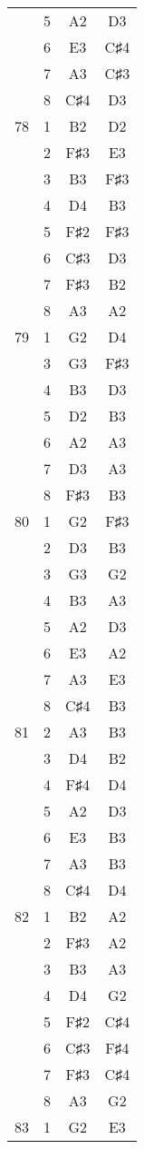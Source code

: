 \documentclass{article}
\begin{document}
\begin{longtable}{|c|c|c|c|}
  & 5 & A2 & D3 \\ 
  & 6 & E3 & C♯4 \\ 
  & 7 & A3 & C♯3 \\ 
  & 8 & C♯4 & D3 \\ 
\hline
78 & 1 & B2 & D2 \\ 
  & 2 & F♯3 & E3 \\ 
  & 3 & B3 & F♯3 \\ 
  & 4 & D4 & B3 \\ 
  & 5 & F♯2 & F♯3 \\ 
  & 6 & C♯3 & D3 \\ 
  & 7 & F♯3 & B2 \\ 
  & 8 & A3 & A2 \\ 
\hline
79 & 1 & G2 & D4 \\ 
  & 3 & G3 & F♯3 \\ 
  & 4 & B3 & D3 \\ 
  & 5 & D2 & B3 \\ 
  & 6 & A2 & A3 \\ 
  & 7 & D3 & A3 \\ 
  & 8 & F♯3 & B3 \\ 
\hline
80 & 1 & G2 & F♯3 \\ 
  & 2 & D3 & B3 \\ 
  & 3 & G3 & G2 \\ 
  & 4 & B3 & A3 \\ 
  & 5 & A2 & D3 \\ 
  & 6 & E3 & A2 \\ 
  & 7 & A3 & E3 \\ 
  & 8 & C♯4 & B3 \\ 
\hline
81 & 2 & A3 & B3 \\ 
  & 3 & D4 & B2 \\ 
  & 4 & F♯4 & D4 \\ 
  & 5 & A2 & D3 \\ 
  & 6 & E3 & B3 \\ 
  & 7 & A3 & B3 \\ 
  & 8 & C♯4 & D4 \\ 
\hline
82 & 1 & B2 & A2 \\ 
  & 2 & F♯3 & A2 \\ 
  & 3 & B3 & A3 \\ 
  & 4 & D4 & G2 \\ 
  & 5 & F♯2 & C♯4 \\ 
  & 6 & C♯3 & F♯4 \\ 
  & 7 & F♯3 & C♯4 \\ 
  & 8 & A3 & G2 \\ 
\hline
83 & 1 & G2 & E3 \\ 

\end{longtable}
\end{document}
